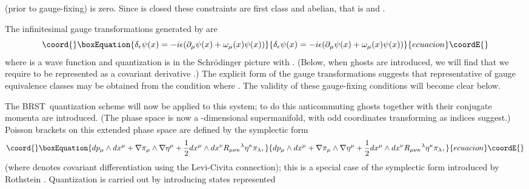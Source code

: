 \documentclass[a4paper,fleqn,12pt]{article}
\providecommand{\Omu}{\omega_{\mu}}
\providecommand{\Pmu}{p_{\mu}}
\providecommand{\Xmu}{x^{\mu}}
\providecommand{\XXmu}{X^{\mu}}
\providecommand{\Pimu}{\pi_{\mu}}
\providecommand{\Etamu}{\eta^{\mu}}
\providecommand{\Tmu}{T_{\mu}}
\providecommand{\Dmu}{\partial_{\mu}}
\providecommand{\DDmu}{\nabla_{\mu}}
\providecommand{\Curv}[4]{R_{#1 #2 #3}{}^{#4}}
\providecommand{\Pb}[2]{\left\{ #1,#2 \right\}}
\providecommand{\BRST}{{\small BRST}}
\begin{document}
(prior to gauge-fixing) is zero. Since \myHighlight{$\omega$}\coordHE{} is closed these
constraints are first class and abelian, that is
\myHighlight{$\Pb{\Tmu}{T_{\nu}}=0$}\coordHE{} and \myHighlight{$\Pb{\Tmu}{H_c}=0$}\coordHE{}.
 \par
The infinitesimal gauge transformations generated by \myHighlight{$\Tmu$}\coordHE{} are
 \begin{equation}\coord{}\boxEquation{\label{GTeq}
  \delta_{\epsilon}\psi(x) =-i \epsilon(\Dmu \psi(x) + \Omu(x) \psi(x))
 }{\delta_{\epsilon}\psi(x) =-i \epsilon(\Dmu \psi(x) + \Omu(x) \psi(x))
 }{ecuacion}\coordE{}\end{equation}
where \coordHE{} is a wave function and  quantization is in the
Schr\"odinger picture with \myHighlight{$\Pmu =-i \Dmu$}\coordHE{}.  (Below, when ghosts are
introduced, we will find that we require \myHighlight{$\Pmu$}\coordHE{} to be represented
as a covariant derivative \myHighlight{$-i\DDmu$}\coordHE{}.) The explicit form of the gauge
transformations  suggests that
representative of gauge equivalence classes may be obtained from
the condition \myHighlight{$\XXmu \psi=0$}\coordHE{} where
 \myHighlight{$\XXmu=g^{\mu\nu} (p_{\nu}  + i\omega_{\nu})$}\coordHE{}. The validity of these
gauge-fixing conditions will become clear below.
 \par
The \BRST\ quantization scheme will now be applied to this system;
to do this anticommuting ghosts  \myHighlight{$\Etamu$}\coordHE{} together with their
conjugate momenta \myHighlight{$\Pimu$}\coordHE{} are introduced. (The phase space is now
a \coordHE{}-dimensional supermanifold, with odd coordinates
\myHighlight{$\Etamu,\Pimu$}\coordHE{} transforming as indices suggest.) Poisson brackets
on this extended phase space are defined by the symplectic form
 \begin{equation}\coord{}\boxEquation{\label{SPBeq}
  d\Pmu \wedge d \Xmu + \nabla\Pimu \wedge \nabla\Etamu
   +  \frac12 dx^{\mu} \wedge dx^{\nu}
  \Curv{\mu}{\nu}{\kappa}{\lambda}\eta^{\kappa}\pi_{\lambda},
 }{d\Pmu \wedge d \Xmu + \nabla\Pimu \wedge \nabla\Etamu
   +  \frac12 dx^{\mu} \wedge dx^{\nu}
  \Curv{\mu}{\nu}{\kappa}{\lambda}\eta^{\kappa}\pi_{\lambda},
 }{ecuacion}\coordE{}\end{equation}
(where \myHighlight{$\nabla$}\coordHE{} denotes covariant differentiation using the
Levi-Civita connection); this is a special case of the symplectic
form introduced by Rothstein \cite{Rothst91}. Quantization
 is carried out by introducing states represented
\end{document}
